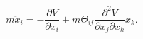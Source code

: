 \begin{equation}
m\ddot x_{i}=-\frac{\partial V}{\partial x_{i}}+
m\Theta_{ij}\frac{\partial^{2 } V } { \partial x_{j}\partial x_{k}}
\dot x_{k }. \label{eq:..}
\end{equation}

